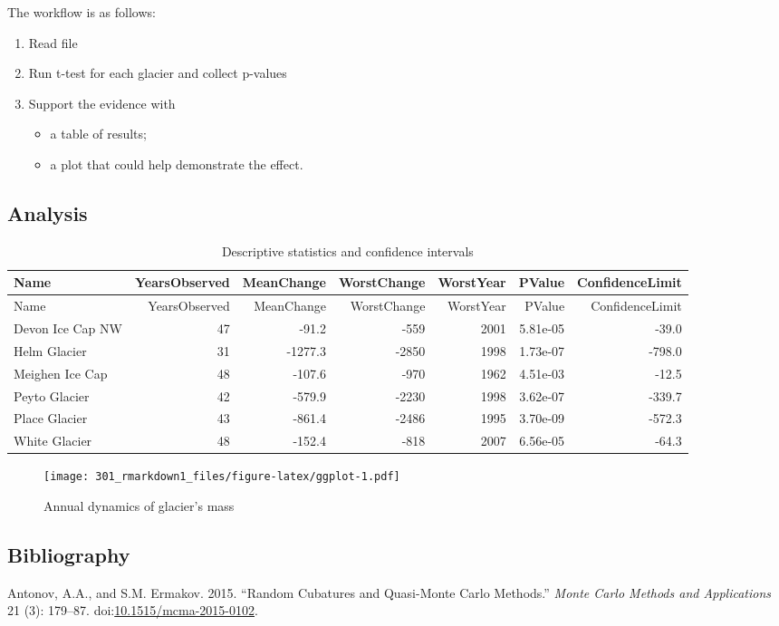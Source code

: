 \documentclass[]{article}
\providecommand{\tightlist}{%
  \setlength{\itemsep}{0pt}\setlength{\parskip}{0pt}}
\begin{document}
The workflow is as follows:

\begin{enumerate}
\def\labelenumi{\arabic{enumi}.}
\tightlist
\item
  Read file
\item
  Run t-test for each glacier and collect p-values
\item
  Support the evidence with

  \begin{itemize}
  \tightlist
  \item
    a table of results;
  \item
    a plot that could help demonstrate the effect.
  \end{itemize}
\end{enumerate}

\subsection{Analysis}\label{analysis}

\begin{longtable}[]{@{}lrrrrrr@{}}
\caption{Descriptive statistics and confidence intervals}\tabularnewline
\toprule
Name & YearsObserved & MeanChange & WorstChange & WorstYear & PValue &
ConfidenceLimit\tabularnewline
\midrule
\endfirsthead
\toprule
Name & YearsObserved & MeanChange & WorstChange & WorstYear & PValue &
ConfidenceLimit\tabularnewline
\midrule
\endhead
Devon Ice Cap NW & 47 & -91.2 & -559 & 2001 & 5.81e-05 &
-39.0\tabularnewline
Helm Glacier & 31 & -1277.3 & -2850 & 1998 & 1.73e-07 &
-798.0\tabularnewline
Meighen Ice Cap & 48 & -107.6 & -970 & 1962 & 4.51e-03 &
-12.5\tabularnewline
Peyto Glacier & 42 & -579.9 & -2230 & 1998 & 3.62e-07 &
-339.7\tabularnewline
Place Glacier & 43 & -861.4 & -2486 & 1995 & 3.70e-09 &
-572.3\tabularnewline
White Glacier & 48 & -152.4 & -818 & 2007 & 6.56e-05 &
-64.3\tabularnewline
\bottomrule
\end{longtable}

\begin{figure}[htbp]
\centering
\texttt{[image: 301\_rmarkdown1\_files/figure-latex/ggplot-1.pdf]}
\caption{Annual dynamics of glacier's mass}
\end{figure}

\subsection*{Bibliography}\label{bibliography}

\hypertarget{refs}{}
\hypertarget{ref-AntonovErmakov_RandomCubaturesQMC}{}
Antonov, A.A., and S.M. Ermakov. 2015. ``Random Cubatures and
Quasi-Monte Carlo Methods.'' \emph{Monte Carlo Methods and Applications}
21 (3): 179--87.
doi:\href{https://doi.org/10.1515/mcma-2015-0102}{10.1515/mcma-2015-0102}.
\end{document}
